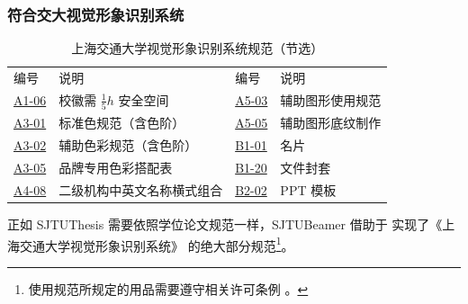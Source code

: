 \begin{frame}
  \frametitle{符合交大视觉形象识别系统}

  \begin{table}
    \caption{上海交通大学视觉形象识别系统规范（节选）}
    \vspace*{-5pt}
    \begin{stampbox}
      \footnotesize
      \begin{tabular}{llll}
        \alert{编号}                                                   & \alert{说明}                   & \alert{编号}                                                   & \alert{说明}     \\
        \href{https://vi.sjtu.edu.cn/index.php/articles/base/1}{A1-06} & 校徽需 $\frac{1}{5}h$ 安全空间 & \href{https://vi.sjtu.edu.cn/index.php/articles/base/5}{A5-03} & 辅助图形使用规范 \\
        \href{https://vi.sjtu.edu.cn/index.php/articles/base/3}{A3-01} & 标准色规范（含色阶）           & \href{https://vi.sjtu.edu.cn/index.php/articles/base/5}{A5-05} & 辅助图形底纹制作 \\
        \href{https://vi.sjtu.edu.cn/index.php/articles/base/3}{A3-02} & 辅助色彩规范（含色阶）         & \href{https://vi.sjtu.edu.cn/index.php/articles/app/7}{B1-01}  & 名片             \\
        \href{https://vi.sjtu.edu.cn/index.php/articles/base/3}{A3-05} & 品牌专用色彩搭配表             & \href{https://vi.sjtu.edu.cn/index.php/articles/app/7}{B1-20}  & 文件封套         \\
        \href{https://vi.sjtu.edu.cn/index.php/articles/base/4}{A4-08} & 二级机构中英文名称横式组合     & \href{https://vi.sjtu.edu.cn/index.php/articles/app/8}{B2-02}  & PPT 模板         \\
      \end{tabular}
    \end{stampbox}
  \end{table}

  正如 SJTUThesis 需要依照学位论文规范一样，SJTUBeamer 借助于 \TikZ{} 实现了《上海交通大学视觉形象识别系统》 的绝大部分规范\footnote{使用规范所规定的用品需要遵守相关许可条例 。}。


\end{frame}

